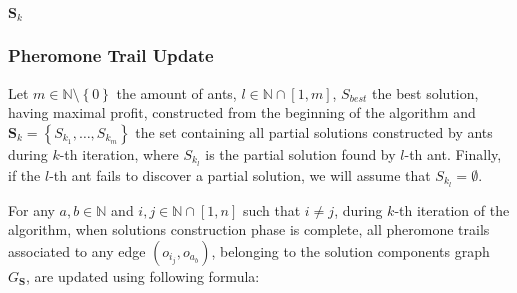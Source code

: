 \documentclass[12pt,a4paper]{report}
\newcommand{\N}{\mathbb{N}}
\newcommand{\SetMinusZero}{\setminus \left\{0\right\}}
\newcommand{\SetFromOneTo}[1]{\N \cap \left[1,#1\right]}
\theoremstyle{definition}
\begin{document}
\begin{algorithm}
	
	\Return $\textbf{S}_k$
\end{algorithm}

\subsubsection{Pheromone Trail Update}

Let $m \in \N \SetMinusZero$ the amount of ants, $l \in \SetFromOneTo{m}$, $S_{best}$ the best solution, having maximal profit, constructed from the beginning of the algorithm and $\textbf{S}_k = \left\{S_{k_1}, \ldots, S_{k_m} \right\}$ the set containing all partial solutions constructed by ants during $k$-th iteration, where $S_{k_l}$ is the partial solution found by $l$-th ant. Finally, if the $l$-th ant fails to discover a partial solution, we will assume that $S_{k_l} = \emptyset$. 

For any $a,b \in \N$ and $i,j \in \SetFromOneTo{n}$ such that $i \neq j$, during $k$-th iteration of the algorithm, when solutions construction phase is complete, all pheromone trails associated to any edge $(o_{i_j}, o_{a_b})$, belonging to the solution components graph $G_{\textbf{S}}$, are updated using following formula:
\end{document}
